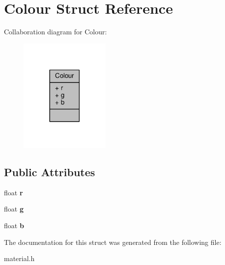 \hypertarget{struct_colour}{}\section{Colour Struct Reference}
\label{struct_colour}


Collaboration diagram for Colour\+:\nopagebreak
\begin{figure}[H]
\begin{center}
\leavevmode
\includegraphics[width=125pt]{struct_colour__coll__graph}
\end{center}
\end{figure}
\subsection*{Public Attributes}
\begin{DoxyCompactItemize}
\item 
float {\bfseries r}\hypertarget{struct_colour_acb0b39e6e5e18b946732f51f126c8bf8}{}\label{struct_colour_acb0b39e6e5e18b946732f51f126c8bf8}

\item 
float {\bfseries g}\hypertarget{struct_colour_a25bdab33ddd5f646162329bfb8b23b75}{}\label{struct_colour_a25bdab33ddd5f646162329bfb8b23b75}

\item 
float {\bfseries b}\hypertarget{struct_colour_aee312356ce76f9c54c9beecad919b421}{}\label{struct_colour_aee312356ce76f9c54c9beecad919b421}

\end{DoxyCompactItemize}


The documentation for this struct was generated from the following file\+:\begin{DoxyCompactItemize}
\item 
material.\+h\end{DoxyCompactItemize}
